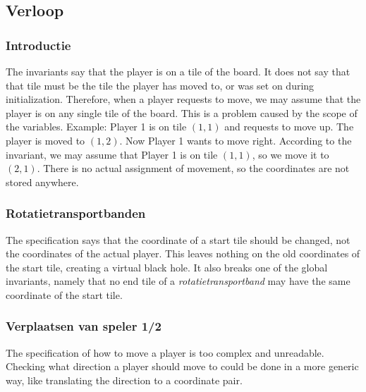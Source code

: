 \documentclass[a4paper,twoside,11pt]{article}
\begin{document}

\subsection{Verloop} %
\label{sec:verloop}

  \subsubsection{Introductie} %
  \label{sub:introduction}
    The invariants say that the player is on a tile of the board. It does not say that that tile must be the tile the player has moved to, or was set on during initialization. Therefore, when a player requests to move, we may assume that the player is on any single tile of the board. This is a problem caused by the scope of the variables.
    Example: Player 1 is on tile $(1,1)$ and requests to move up. The player is moved to $(1,2)$. Now Player 1 wants to move right. According to the invariant, we may assume that Player 1 is on tile $(1,1)$, so we move it to $(2,1)$. There is no actual assignment of movement, so the coordinates are not stored anywhere.

  \subsubsection{Rotatietransportbanden} %
  \label{sub:rotatietransportbanden}

    The specification says that the coordinate of a start tile should be changed, not the coordinates of the actual player. This leaves nothing on the old coordinates of the start tile, creating a virtual black hole. It also breaks one of the global invariants, namely that no end tile of a \emph{rotatietransportband} may have the same coordinate of the start tile.\\


  \subsubsection{Verplaatsen van speler 1/2} %
  \label{sub:verplaatsen_van_speler_1_2}
    The specification of how to move a player is too complex and unreadable. Checking what direction a player should move to could be done in a more generic way, like translating the direction to a coordinate pair.
\end{document}
